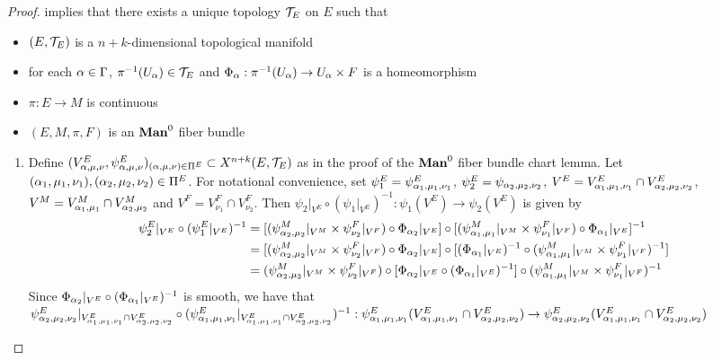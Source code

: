 \documentclass{book}
\begin{document}
	\begin{proof}
		 implies that there exists a unique topology $\mathcal{T}_E$ on $E$ such that 
		\begin{itemize}
			\item $(E, \mathcal{T}_E)$ is a $n+k$-dimensional topological manifold 
			\item for each $\alpha \in \Gamma$, $ \pi^{-1}(U_{\alpha}) \in \mathcal{T}_E$ and $\Phi_{\alpha}: \pi^{-1}(U_{\alpha}) \rightarrow U_{\alpha} \times F$ is a homeomorphism
			\item $\pi: E \rightarrow M$ is continuous
			\item $(E, M, \pi, F)$ is an $\operatorname*{\text{\textbf{Man}}^0}$ fiber bundle
		\end{itemize}
		\begin{enumerate}
			\item Define $(V^E_{\alpha, \mu, \nu}, \psi^E_{\alpha, \mu, \nu})_{(\alpha, \mu, \nu) \in \Pi^E} \subset X^{n+k}(E, \mathcal{T}_E)$ as in the proof of the $\operatorname*{\text{\textbf{Man}}^0}$ fiber bundle chart lemma. Let $(\alpha_1, \mu_1, \nu_1), (\alpha_2, \mu_2, \nu_2) \in \Pi^E$. For notational convenience, set $\psi^E_1 = \psi^E_{\alpha_1, \mu_1, \nu_1}$, $\psi^E_2 = \psi_{\alpha_2, \mu_2, \nu_2}$, $V^E = V^E_{\alpha_1, \mu_1, \nu_1} \cap V^E_{\alpha_2, \mu_2, \nu_2}$, $V^M = V_{\alpha_1, \mu_1}^M \cap V^M_{\alpha_2, \mu_2}$ and $V^F = V^F_{\nu_1} \cap V^F_{\nu_2}$. Then $\psi_2|_{V^E} \circ (\psi_1|_{V^E})^{-1}: \psi_1(V^E) \rightarrow \psi_2(V^E)$ is given by
			\begin{align*}
				\psi^E_2|_{V^E} \circ (\psi^E_1|_{V^E})^{-1}
				& = [(\psi_{\alpha_2, \mu_2}^M|_{V^M} \times \psi_{\nu_2}^F|_{V^F}) \circ \Phi_{\alpha_2}|_{V^E}] \circ [(\psi_{\alpha_1, \mu_1}^M|_{V^M} \times \psi_{\nu_1}^F|_{V^F}) \circ \Phi_{\alpha_1}|_{V^E}]^{-1} \\
				& = [(\psi_{\alpha_2, \mu_2}^M|_{V^M} \times \psi_{\nu_2}^F|_{V^F}) \circ \Phi_{\alpha_2}|_{V^E}] \circ [(\Phi_{\alpha_1}|_{V^E})^{-1} \circ (\psi_{\alpha_1, \mu_1}^M|_{V^M} \times \psi_{\nu_1}^F|_{V^F})^{-1}] \\
				& = (\psi_{\alpha_2, \mu_2}^M|_{V^M} \times \psi_{\nu_2}^F|_{V^F}) \circ [\Phi_{\alpha_2}|_{V^E} \circ (\Phi_{\alpha_1}|_{V^E})^{-1}] \circ (\psi_{\alpha_1, \mu_1}^M|_{V^M} \times \psi_{\nu_1}^F|_{V^F})^{-1}
			\end{align*}
			Since $\Phi_{\alpha_2}|_{V^E} \circ (\Phi_{\alpha_1}|_{V^E})^{-1}$ is smooth, we have that 
			$\psi^E_{\alpha_2, \mu_2, \nu_2}|_{V^E_{\alpha_1, \mu_1, \nu_1} \cap V^E_{\alpha_2, \mu_2, \nu_2}} \circ (\psi^E_{\alpha_1, \mu_1, \nu_1}|_{V^E_{\alpha_1, \mu_1, \nu_1} \cap V^E_{\alpha_2, \mu_2, \nu_2}})^{-1}: \psi^E_{\alpha_1, \mu_1, \nu_1}(V^E_{\alpha_1, \mu_1, \nu_1} \cap V^E_{\alpha_2, \mu_2, \nu_2}) \rightarrow \psi^E_{\alpha_2, \mu_2, \nu_2}(V^E_{\alpha_1, \mu_1, \nu_1} \cap V^E_{\alpha_2, \mu_2, \nu_2})$

\end{enumerate}
\end{proof}
\end{document}
